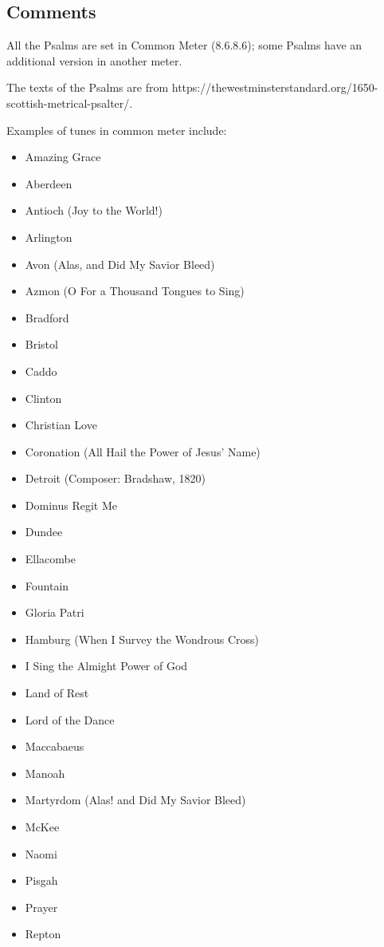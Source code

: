 \subsection*{Comments}

All the Psalms are set in Common Meter (8.6.8.6); some Psalms have an additional version in another meter.

The texts of the Psalms are from https://thewestminsterstandard.org/1650-scottish-metrical-psalter/.

Examples of tunes in common meter include:

\begin{itemize}
\sc\item Amazing Grace
  \item Aberdeen
	\item Antioch (\textup{Joy to the World!}) 
	\item Arlington
	\item Avon (Alas, and Did My Savior Bleed)
	\item Azmon (\textup{O For a Thousand Tongues to Sing})
	\item Bradford
	\item Bristol
	\item Caddo
	\item Clinton
	\item Christian Love
	\item Coronation \textup{(All Hail the Power of Jesus' Name)}
	\item Detroit (Composer: Bradshaw, 1820)
	\item Dominus Regit Me
	\item Dundee
	\item Ellacombe
	\item Fountain
	\item Gloria Patri
	\item Hamburg (\textup{When I Survey the Wondrous Cross})
  \item I Sing the Almight Power of God
	\item Land of Rest
	\item Lord of the Dance
	\item Maccabaeus
	\item Manoah
	\item Martyrdom (\textup{Alas! and Did My Savior Bleed})
	\item McKee
	\item Naomi
	\item Pisgah
	\item Prayer
	\item Repton

\end{itemize}

